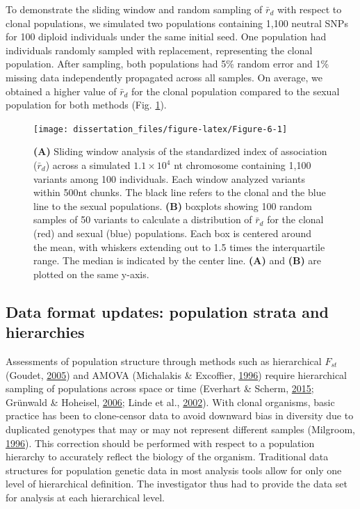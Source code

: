 \documentclass[double,11pt]{beavtex}
\begin{document}
  To demonstrate the sliding window and random sampling of \(\bar{r}_d\)
  with respect to clonal populations, we simulated two populations
  containing 1,100 neutral SNPs for 100 diploid individuals under the same
  initial seed. One population had individuals randomly sampled with
  replacement, representing the clonal population. After sampling, both
  populations had 5\% random error and 1\% missing data independently
  propagated across all samples. On average, we obtained a higher value of
  \(\bar{r}_d\) for the clonal population compared to the sexual
  population for both methods (Fig. \ref{fig:Figure-6}).
  
  \begin{figure}
  
  {\centering \texttt{[image: dissertation\_files/figure-latex/Figure-6-1]} 
  
  }
  
  \caption[Sliding window analysis of the standardized index of association
  (\(\bar{r}_d\))]{\textbf{(A)} Sliding window analysis of the standardized index of
  association (\(\bar{r}_d\)) across a simulated \(1.1 \times 10^4\) nt
  chromosome containing 1,100 variants among 100 individuals. Each window
  analyzed variants within 500nt chunks. The black line refers to the
  clonal and the blue line to the sexual populations. \textbf{(B)}
  boxplots showing 100 random samples of 50 variants to calculate a
  distribution of \(\bar{r}_d\) for the clonal (red) and sexual (blue)
  populations. Each box is centered around the mean, with whiskers
  extending out to 1.5 times the interquartile range. The median is
  indicated by the center line. \textbf{(A)} and \textbf{(B)} are plotted
  on the same y-axis.}\label{fig:Figure-6}
  \end{figure}
  
  \subsection{Data format updates: population strata and
  hierarchies}\label{data-format-updates-population-strata-and-hierarchies}
  
  Assessments of population structure through methods such as hierarchical
  \(F_{st}\) (Goudet, \protect\hyperlink{ref-goudet2005hierfstat}{2005})
  and AMOVA (Michalakis \& Excoffier,
  \protect\hyperlink{ref-michalakis1996generic}{1996}) require
  hierarchical sampling of populations across space or time (Everhart \&
  Scherm, \protect\hyperlink{ref-everhart2014fine}{2015}; Grünwald \&
  Hoheisel, \protect\hyperlink{ref-grunwald2006hierarchical}{2006}; Linde
  et al., \protect\hyperlink{ref-linde2002population}{2002}). With clonal
  organisms, basic practice has been to clone-censor data to avoid
  downward bias in diversity due to duplicated genotypes that may or may
  not represent different samples (Milgroom,
  \protect\hyperlink{ref-milgroom1996recombination}{1996}). This
  correction should be performed with respect to a population hierarchy to
  accurately reflect the biology of the organism. Traditional data
  structures for population genetic data in most analysis tools allow for
  only one level of hierarchical definition. The investigator thus had to
  provide the data set for analysis at each hierarchical level.
  
\end{document}
